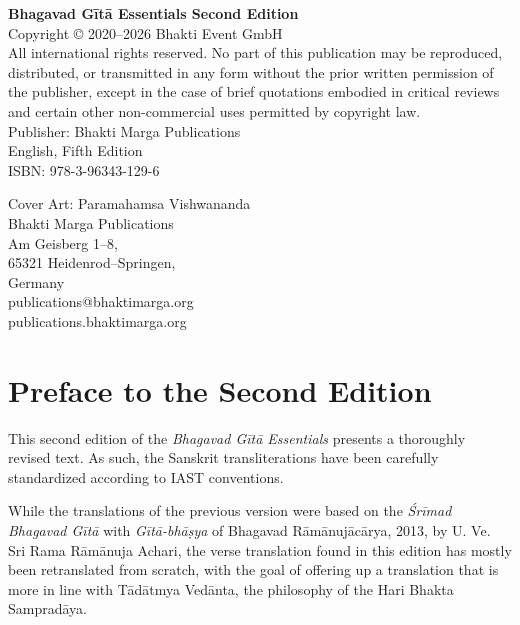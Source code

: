\documentclass[12pt, twoside, openright]{memoir}
\begin{document}
\thispagestyle{empty}

\vspace*{\fill}
{\footnotesize
\noindent
\begin{flushleft}
  \textbf{Bhagavad Gītā Essentials Second Edition} \\[1em]

  Copyright © 2020--2026 Bhakti Event GmbH \\[1em]

  All international rights reserved. No part of this publication may be reproduced, distributed, or transmitted in any form without the prior written permission of the publisher, except in the case of brief quotations embodied in critical reviews and certain other non-commercial uses permitted by copyright law. \\[1em]

  Publisher: Bhakti Marga Publications \\[1em]

  English, Fifth Edition \\[1em]

  ISBN: 978-3-96343-129-6 

  Cover Art: Paramahamsa Vishwananda \\[1em]

  Bhakti Marga Publications \\
  Am Geisberg 1–8, \\
  65321 Heidenrod–Springen, \\
  Germany \\[1em]

  publications@bhaktimarga.org \\
  publications.bhaktimarga.org
\end{flushleft}
} \chapter{Preface to the Second Edition}\label{chap-preface-to-the-second-edition}
\bigskip



This second edition of the \textit{Bhagavad Gītā Essentials} presents a thoroughly revised text. As such, the Sanskrit transliterations have been carefully standardized according to IAST conventions. 

While the translations of the previous version were based on the \textit{Śrīmad Bhagavad Gītā} with \textit{Gītā-bhāṣya} of Bhagavad Rāmānujācārya, 2013, by U. Ve. Sri Rama Rāmānuja Achari, the verse translation found in this edition has mostly been retranslated from scratch, with the goal of offering up a translation that is more in line with Tādātmya Vedānta, the philosophy of the Hari Bhakta Sampradāya. 
\end{document}

